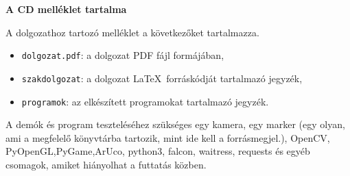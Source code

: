 \pagestyle{empty}

\noindent \textbf{\Large A CD melléklet tartalma}

\vskip 1cm

\noindent A dolgozathoz tartozó melléklet a következőket tartalmazza.

\begin{itemize}
\item \texttt{dolgozat.pdf}: a dolgozat PDF fájl formájában,
\item \texttt{szakdolgozat}: a dolgozat \LaTeX\ forráskódját tartalmazó jegyzék,
\item \texttt{programok}: az elkészített programokat tartalmazó jegyzék.
\end{itemize}


A demók és program teszteléséhez szükséges egy kamera, egy marker (egy olyan, ami a megfelelő könyvtárba tartozik, mint ide kell a forrásmegjel.),
OpenCV, PyOpenGL,PyGame,ArUco, python3, falcon, waitress, requests és egyéb csomagok, amiket hiányolhat a futtatás közben.



